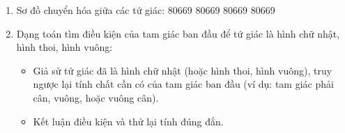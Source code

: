 \begin{enumerate}
\item Sơ đồ chuyển hóa giữa các tứ giác:
80669      80669
80669      80669
\item Dạng toán tìm điều kiện của tam giác ban đầu để tứ giác là hình chữ nhật, hình thoi, hình vuông:
\begin{itemize}
\item Giả sử tứ giác đã là hình chữ nhật (hoặc hình thoi, hình vuông), truy ngược lại tính chất cần có của tam giác ban đầu (ví dụ: tam giác phải cân, vuông, hoặc vuông cân).
\item Kết luận điều kiện và thử lại tính đúng đắn.
\end{itemize}
\end{enumerate}
